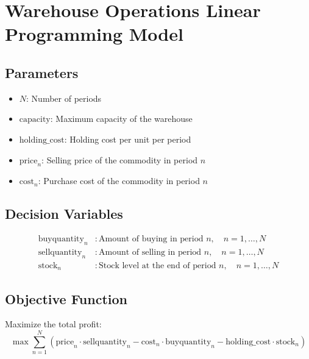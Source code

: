\documentclass{article}
\begin{document}
\section*{Warehouse Operations Linear Programming Model}

\subsection*{Parameters}
\begin{itemize}
    \item \( N \): Number of periods
    \item \( \text{capacity} \): Maximum capacity of the warehouse
    \item \( \text{holding\_cost} \): Holding cost per unit per period
    \item \( \text{price}_n \): Selling price of the commodity in period \( n \)
    \item \( \text{cost}_n \): Purchase cost of the commodity in period \( n \)
\end{itemize}

\subsection*{Decision Variables}
\begin{align*}
    \text{buyquantity}_n & : \text{Amount of buying in period } n, \quad n = 1, \ldots, N \\
    \text{sellquantity}_n & : \text{Amount of selling in period } n, \quad n = 1, \ldots, N \\
    \text{stock}_n & : \text{Stock level at the end of period } n, \quad n = 1, \ldots, N
\end{align*}

\subsection*{Objective Function}
Maximize the total profit:
\[
\max \sum_{n=1}^{N} (\text{price}_n \cdot \text{sellquantity}_n - \text{cost}_n \cdot \text{buyquantity}_n - \text{holding\_cost} \cdot \text{stock}_n)
\]
\end{document}
